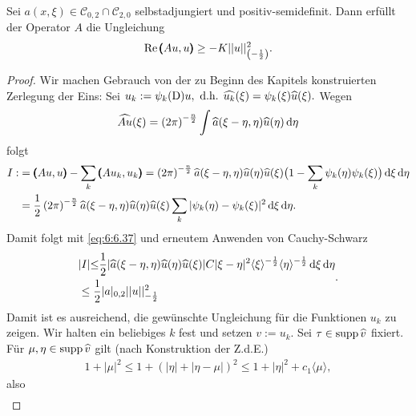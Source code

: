 \begin{thm}
Sei $a(x,\xi)\in\mathcal{C}_{0,2}\cap\mathcal{C}_{2,0}$ selbstadjungiert und positiv-semidefinit. Dann erfüllt der Operator $A$ die Ungleichung
\begin{align}
	\operatorname{Re} \pmb(Au,u\pmb) \ge - K|| u||_{\left(-\frac{1}{2}\right)}^2.
\end{align}

\end{thm}
\begin{proof}
	Wir machen Gebrauch von der zu Beginn des Kapitels konstruierten Zerlegung der Eins: Sei $	u_k:= \psi_k(\mathrm D)u, \text{ d.h. } \widehat{u_k}(\xi) = \psi_k(\xi) \widehat{u}(\xi).$ Wegen 
\begin{align}
	\widehat{Au}(\xi) = \left(2\pi\right)^{-\frac{n}{2}}\int \widehat{a}(\xi-\eta,\eta)\widehat{u}(\eta)\,\mathrm d \eta
\end{align}	 
folgt
\begin{align}
	\begin{split} I:&=\pmb(Au,u\pmb)-\sum\limits_k \pmb(Au_k,u_k\pmb) = \left(2\pi\right)^{-\frac{n}{2}}\relax \widehat{a}(\xi-\eta,\eta)\widehat{u}(\eta)\widehat{u}(\xi)\big(1-\sum\limits_k \psi_k(\eta)\psi_k(\xi)\big)\,\mathrm d \xi\,\mathrm d\eta\\
	&= \frac{1}{2}\left(2\pi\right)^{-\frac{n}{2}} \relax \widehat{a}(\xi-\eta,\eta)\widehat{u}(\eta)\widehat{u}(\xi)\sum\limits_k\vert\psi_k(\eta)-\psi_k(\xi)\vert^2\,\mathrm d \xi\,\mathrm d\eta.
\end{split}
\end{align}
Damit folgt mit \eqref{eq:6:6.37} und erneutem Anwenden von Cauchy-Schwarz
\begin{align}
\begin{split}	&| I| {\le}\frac{1}{2}\relax|\widehat{a}(\xi-\eta,\eta)\widehat{u}(\eta)\widehat{u}(\xi)| C |\xi-\eta|^2\langle \xi\rangle^{-\frac{1}{2}} \langle\eta\rangle^{-\frac{1}{2}}\,\mathrm d \xi \,\mathrm d \eta\\ 
& \le \frac{1}{2}| a|_{0,2}|| u||_{-\frac{1}{2}}^2
\end{split}.
\end{align}
Damit ist es ausreichend, die gewünschte Ungleichung für die Funktionen $u_k$ zu zeigen. Wir halten ein beliebiges $k$ fest und setzen $v:= u_k.$ Sei $\tau\in \operatorname{supp} \widehat{v}$ fixiert. Für $\mu, \eta \in \operatorname{supp} \widehat{v}$ gilt (nach Konstruktion der Z.d.E.)
\begin{align}
	1+|\mu|^2 \le 1+\left(| \eta|+| \eta-\mu|\right)^2 \le 1+|\eta|^2+ c_1 \langle \mu \rangle,
\end{align}
also
\begin{align}

\end{align}
\end{proof}
